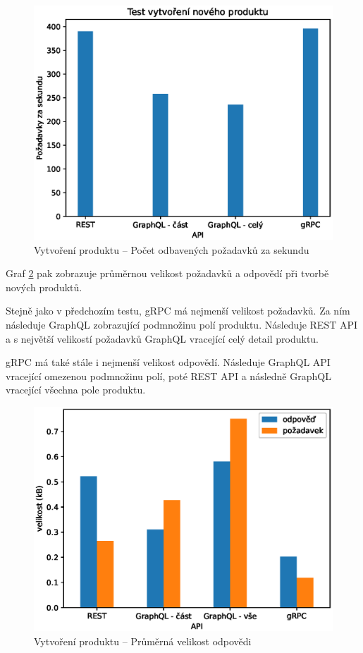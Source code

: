 \documentclass[thesis=M,czech]{FITthesis}[2019/12/23]
\begin{document}
\begin{figure}[]
  \includegraphics[width=\linewidth]{img/create-product.eps}
  \caption{Vytvoření produktu -- Počet odbavených požadavků za sekundu}
\label{test_create_product}
\end{figure}

Graf \ref{test_create_product_size} pak zobrazuje průměrnou velikost požadavků a odpovědí při tvorbě nových produktů. 

Stejně jako v předchozím testu, gRPC má nejmenší velikost požadavků. Za ním následuje GraphQL zobrazující podmnožinu polí produktu. Následuje REST API a s největší velikostí požadavků GraphQL vracející celý detail produktu.

gRPC má také stále i nejmenší velikost odpovědí. Následuje GraphQL API vracející omezenou podmnožinu polí, poté REST API a následně GraphQL vracející všechna pole produktu.
\begin{figure}[]
  \includegraphics[width=\linewidth]{img/req-size-create.eps}
  \caption{Vytvoření produktu -- Průměrná velikost odpovědi}
\label{test_create_product_size}
\end{figure}
\end{document}
